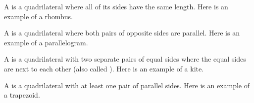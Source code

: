 \documentclass{ximera}
\begin{document}
\begin{definition}
	A  is a quadrilateral where all of its sides have the same length. Here is an example of a rhombus.
	\begin{center}
	\end{center}
\end{definition}


\begin{definition}
	A  is a quadrilateral where both pairs of opposite sides are parallel. Here is an example of a parallelogram.
	\begin{center}
	\end{center}
\end{definition}


\begin{definition}
	A  is a quadrilateral with two separate pairs of equal sides where the equal sides are next to each other (also called ). Here is an example of a kite.
	\begin{center}
	\end{center}
\end{definition}


\begin{definition}
	A  is a quadrilateral with at least one pair of parallel sides. Here is an example of a trapezoid.
	\begin{center}
	\end{center}
\end{definition}
\end{document}
